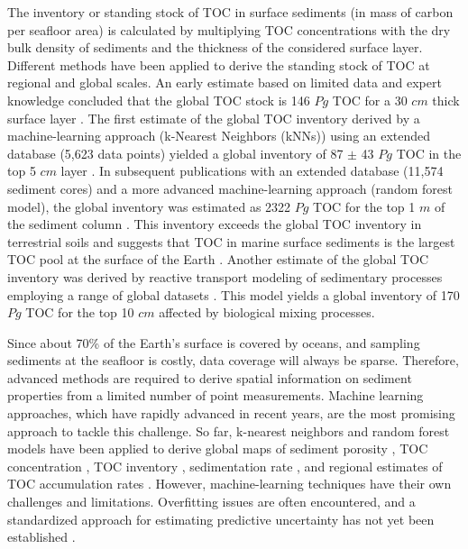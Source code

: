 \documentclass[journal abbreviation, manuscript]{copernicus}
\begin{document}
The inventory or standing stock of TOC in surface sediments (in mass of carbon per seafloor area) is calculated by multiplying TOC concentrations with the dry bulk density of sediments and the thickness of the considered surface layer. Different methods have been applied to derive the standing stock of TOC at regional and global scales. An early estimate based on limited data and expert knowledge concluded that the global TOC stock is 146 $Pg$ TOC for a 30 $cm$ thick surface layer \citep{Emerson1988}. The first estimate of the global TOC inventory derived by a machine-learning approach (k-Nearest Neighbors (kNNs)) using an extended database (5,623 data points) yielded a global inventory of 87 $\pm$ 43 $Pg$ TOC in the top 5 $cm$ layer \citep{LeeTOCkNN}. In subsequent publications with an extended database (11,574 sediment cores) and a more advanced machine-learning approach (random forest model), the global inventory was estimated as 2322 $Pg$ TOC for the top 1 $m$ of the sediment column \citep{atwood2020}. This inventory exceeds the global TOC inventory in terrestrial soils and suggests that TOC in marine surface sediments is the largest TOC pool at the surface of the Earth \citep{atwood2020}. Another estimate of the global TOC inventory was derived by reactive transport modeling of sedimentary processes employing a range of global datasets \citep{larowe2020b}. This model yields a global inventory of 170 $Pg$ TOC for the top 10 $cm$ affected by biological mixing processes.%


Since about 70\% of the Earth's surface is covered by oceans, and sampling sediments at the seafloor is costly, data coverage will always be sparse. Therefore, advanced methods are required to derive spatial information on sediment properties from a limited number of point measurements. Machine learning approaches, which have rapidly advanced in recent years, are the most promising approach to tackle this challenge. So far, k-nearest neighbors and random forest models have been applied to derive global maps of sediment porosity \citep{Martin2005Porosity}, TOC concentration \citep{LeeTOCkNN}, TOC inventory \citep{atwood2020}, sedimentation rate \citep{restrepo2, Restreppo2020}, and regional estimates of TOC accumulation rates \citep{diesing2021}. However, machine-learning techniques have their own challenges and limitations. Overfitting issues are often encountered, and a standardized approach for estimating predictive uncertainty has not yet been established \citep{LeeTOCkNN}.
\end{document}
